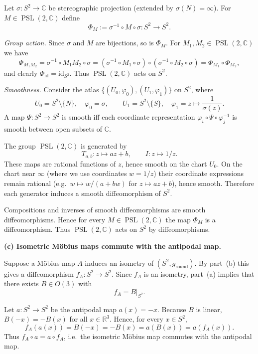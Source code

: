 \begin{solution}
	
	Let $\sigma:S^{2}\to\hat{\mathbb{C}}$ be stereographic projection (extended by $\sigma(N)=\infty$).
	For $M\in\operatorname{PSL}(2,\mathbb{C})$ define
	\[
	\Phi_M := \sigma^{-1}\circ M\circ\sigma:S^{2}\to S^{2}.
	\]
	
	\emph{Group action.}
	Since $\sigma$ and $M$ are bijections, so is $\Phi_M$. For $M_1,M_2\in\operatorname{PSL}(2,\mathbb{C})$ we have
	\[
	\Phi_{M_1M_2}
	=\sigma^{-1}\circ M_1M_2\circ\sigma
	=(\sigma^{-1}\circ M_1\circ\sigma)\circ(\sigma^{-1}\circ M_2\circ\sigma)
	=\Phi_{M_1}\circ\Phi_{M_2},
	\]
	and clearly $\Phi_{\mathrm{id}}=\mathrm{id}_{S^{2}}$. Thus $\operatorname{PSL}(2,\mathbb{C})$ acts on $S^{2}$.
	
	\emph{Smoothness.}
	Consider the atlas $\{(U_0,\varphi_0),(U_1,\varphi_1)\}$ on $S^{2}$, where
	\[
	U_0=S^{2}\setminus\{N\},\quad \varphi_0=\sigma,\qquad
	U_1=S^{2}\setminus\{S\},\quad \varphi_1= z\mapsto \frac{1}{\sigma(z)}.
	\]
	A map $\Psi:S^{2}\to S^{2}$ is smooth iff each coordinate representation
	$\varphi_i\circ\Psi\circ\varphi_j^{-1}$ is smooth between open subsets of $\mathbb{C}$.
	
	The group $\operatorname{PSL}(2,\mathbb{C})$ is generated by
	\[
	T_{a,b}:z\mapsto az+b,\qquad I:z\mapsto 1/z.
	\]
	These maps are rational functions of $z$, hence smooth on the chart $U_0$.
	On the chart near $\infty$ (where we use coordinates $w=1/z$) their coordinate expressions
	remain rational (e.g.\ $w\mapsto w/(a+bw)$ for $z\mapsto az+b$), hence smooth.
	Therefore each generator induces a smooth diffeomorphism of $S^{2}$.
	
	Compositions and inverses of smooth diffeomorphisms are smooth diffeomorphisms.
	Hence for every $M\in\operatorname{PSL}(2,\mathbb{C})$ the map $\Phi_M$ is a diffeomorphism.
	Thus $\operatorname{PSL}(2,\mathbb{C})$ acts on $S^{2}$ by diffeomorphisms.
	
	\par\medskip\noindent\textbf{(c) Isometric M\"obius maps commute with the antipodal map.}\par\smallskip

	
	Suppose a M\"obius map $A$ induces an isometry of $(S^{2},g_{\mathrm{round}})$.
	By part~(b) this gives a diffeomorphism $f_A:S^{2}\to S^{2}$.
	Since $f_A$ is an isometry, part~(a) implies that there exists $B\in O(3)$ with
	\[
	f_A = B|_{S^{2}}.
	\]
	
	Let $a:S^{2}\to S^{2}$ be the antipodal map $a(x)=-x$.
	Because $B$ is linear, $B(-x)=-B(x)$ for all $x\in\mathbb{R}^{3}$.
	Hence, for every $x\in S^{2}$,
	\[
	f_A(a(x)) = B(-x) = -B(x) = a(B(x)) = a(f_A(x)).
	\]
	Thus $f_A\circ a = a\circ f_A$, i.e.\ the isometric M\"obius map commutes with the antipodal map.
	

\end{solution}
